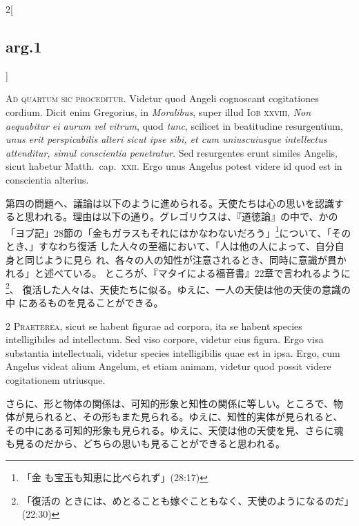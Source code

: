 \documentclass[paper=a4paper,fontsize=10pt,jafontsize=9pt,titlepage]{jlreq}
\begin{document}
\begin{paracol}{2}[\subsection{arg.1}]

{\huge A}{\scshape d quartum sic proceditur}. Videtur quod Angeli
cognoscant cogitationes cordium. Dicit enim Gregorius, in {\itshape
Moralibus}, super illud {\scshape Iob} {\scshape xxviii}, {\itshape
Non aequabitur ei aurum vel vitrum}, quod {\itshape tunc}, scilicet in
beatitudine resurgentium, {\itshape unus erit perspicabilis alteri
sicut ipse sibi, et cum uniuscuiusque intellectus attenditur, simul
conscientia penetratur}. Sed resurgentes erunt similes Angelis, sicut
habetur Matth.~cap.~{\scshape xxii}. Ergo unus Angelus potest videre
id quod est in conscientia alterius.

\switchcolumn

第四の問題へ、議論は以下のように進められる。天使たちは心の思いを認識す
ると思われる。理由は以下の通り。グレゴリウスは、『道徳論』の中で、かの
「ヨブ記」28節の「金もガラスもそれにはかなわないだろう」\footnote{「金
も宝玉も知恵に比べられず」(28:17)}について、「そのとき、」すなわち復活
した人々の至福において、「人は他の人によって、自分自身と同じように見ら
れ、各々の人の知性が注意されるとき、同時に意識が貫かれる」と述べている。
ところが、『マタイによる福音書』22章で言われるように\footnote{「復活の
ときには、めとることも嫁ぐこともなく、天使のようになるのだ」(22:30)}、
復活した人々は、天使たちに似る。ゆえに、一人の天使は他の天使の意識の中
にあるものを見ることができる。


{\scshape 2 Praeterea}, sicut se habent figurae ad corpora, ita se
habent species intelligibiles ad intellectum. Sed viso corpore,
videtur eius figura. Ergo visa substantia intellectuali, videtur
species intelligibilis quae est in ipsa. Ergo, cum Angelus videat
alium Angelum, et etiam animam, videtur quod possit videre
cogitationem utriusque.

\switchcolumn

さらに、形と物体の関係は、可知的形象と知性の関係に等しい。ところで、物
体が見られると、その形もまた見られる。ゆえに、知性的実体が見られると、
その中にある可知的形象も見られる。ゆえに、天使は他の天使を見、さらに魂
も見るのだから、どちらの思いも見ることができると思われる。


\end{paracol}
\end{document}
